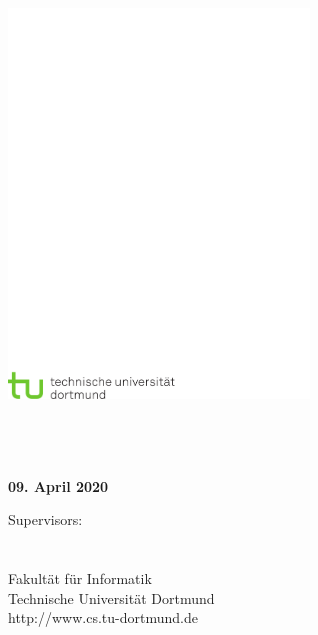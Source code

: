 \thispagestyle{empty}
\begin{titlepage}
\vspace*{-2cm}
\newlength{\links}
\setlength{\links}{-0.5cm} \sffamily \LARGE



\hspace*{\links}
\begin{minipage}{12.5cm}
\includegraphics[width=8cm]{coverpage/tud_logo_cmyk}
\end{minipage}

\vspace*{4cm}

\hspace*{\links}
\hspace*{-0.2cm}
\begin{minipage}{9cm}
\large
\begin{center}
\bfseries{\Titel} \\
\vspace*{1cm}
{\small \Untertitel} \\
\vspace*{1.5cm}
\Autor\\
09. April 2020
\end{center}
\end{minipage}



\vfill

\hspace*{\links}
\begin{minipage}[b]{15cm}
\normalsize
\raggedright
%
\vspace*{2.5cm}
%
\normalsize \raggedright
Supervisors: \\
\Supervisor \\
\otherSupervisor \\ 
\vspace*{1.5cm}
\textcolor{TUGreen}{Fakultät für Informatik\\
Technische Universität Dortmund \\
http://www.cs.tu-dortmund.de}
\end{minipage}


\end{titlepage}
